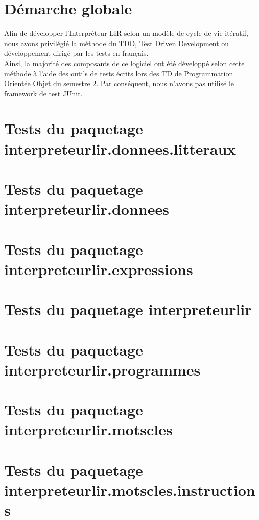 \chapter*{Démarche globale}
Afin de développer l'Interpréteur LIR selon un modèle de cycle de vie
itératif, nous avons privilégié la méthode du TDD, Test Driven Development ou
développement dirigé par les tests en français.
\\Ainsi, la majorité des composants de ce logiciel ont été développé selon
cette méthode à l'aide des outils de tests écrits lors des TD de Programmation
Orientée Objet du semestre 2. Par conséquent, nous n'avons pas utilisé le
framework de test JUnit.

\chapter{Tests du paquetage interpreteurlir.donnees.litteraux}


\chapter{Tests du paquetage interpreteurlir.donnees}


\chapter{Tests du paquetage interpreteurlir.expressions}


\chapter{Tests du paquetage interpreteurlir}


\chapter{Tests du paquetage interpreteurlir.programmes}


\chapter{Tests du paquetage interpreteurlir.motscles}


\chapter{Tests du paquetage interpreteurlir.motscles.instructions}
